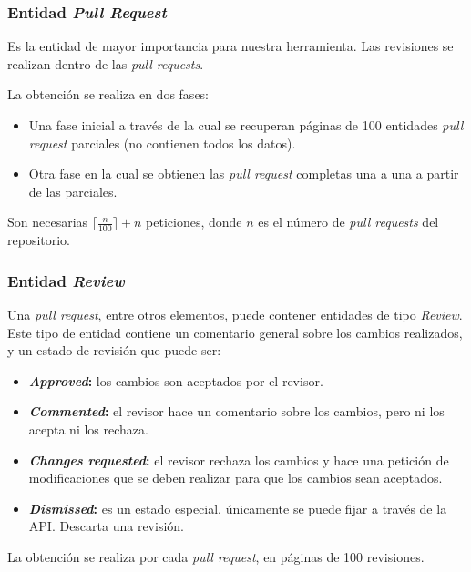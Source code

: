 \subsubsection{Entidad \textit{Pull Request}}

Es la entidad de mayor importancia para nuestra herramienta. Las revisiones se realizan dentro de las \textit{pull requests}.

La obtención se realiza en dos fases:

\begin{itemize}
\item Una fase inicial a través de la cual se recuperan páginas de 100 entidades \textit{pull request} parciales (no contienen todos los datos).
\item Otra fase en la cual se obtienen las \textit{pull request} completas una a una a partir de las parciales.
\end{itemize}


Son necesarias $\lceil\frac{n}{100}\rceil + n$ peticiones, donde $n$ es el número de \textit{pull requests} del repositorio.

\subsubsection{Entidad \textit{Review}}

Una \textit{pull request}, entre otros elementos, puede contener entidades de tipo \textit{Review}. Este tipo de entidad contiene un comentario general sobre los cambios realizados, y un estado de revisión que puede ser:

\begin{itemize}
\tightlist
	\item \textbf{\textit{Approved}:} los cambios son aceptados por el revisor.
	\item \textbf{\textit{Commented}:} el revisor hace un comentario sobre los cambios, pero ni los acepta ni los rechaza.
	\item \textbf{\textit{Changes requested}:} el revisor rechaza los cambios y hace una petición de modificaciones que se deben realizar para que los cambios sean aceptados.
	\item \textbf{\textit{Dismissed}:} es un estado especial, únicamente se puede fijar a través de la API. Descarta una revisión.
\end{itemize}

La obtención se realiza por cada \textit{pull request}, en páginas de 100 revisiones.

